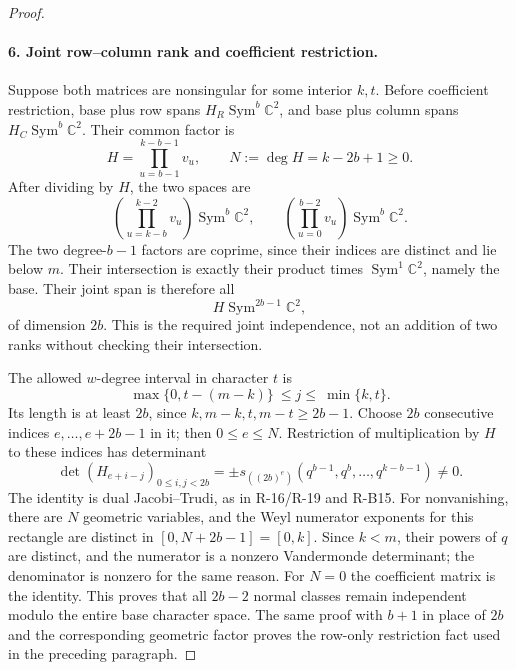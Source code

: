 \begin{proof}
\paragraph{6. Joint row--column rank and coefficient restriction.}
Suppose both matrices are nonsingular for some interior $k,t$.
Before coefficient restriction, base plus row spans
$H_R\operatorname{Sym}^b\mathbb C^2$, and base plus column spans
$H_C\operatorname{Sym}^b\mathbb C^2$. Their common factor is
\[
 H=\prod_{u=b-1}^{k-b-1}v_u,
 \qquad N:=\deg H=k-2b+1\geq0.
\]
After dividing by $H$, the two spaces are
\[
 \left(\prod_{u=k-b}^{k-2}v_u\right)\operatorname{Sym}^b\mathbb C^2,
 \qquad
 \left(\prod_{u=0}^{b-2}v_u\right)\operatorname{Sym}^b\mathbb C^2.
\]
The two degree-$b-1$ factors are coprime, since their indices are
distinct and lie below $m$. Their intersection is exactly their
product times $\operatorname{Sym}^1\mathbb C^2$, namely the base.
Their joint span is therefore all
\begin{equation}\label{R22:joint_space}
 H\operatorname{Sym}^{2b-1}\mathbb C^2,
\end{equation}
of dimension $2b$. This is the required joint independence, not an
addition of two ranks without checking their intersection.

The allowed $w$-degree interval in character $t$ is
\[
 \max\{0,t-(m-k)\}\ \leq j\leq\ \min\{k,t\}.
\]
Its length is at least $2b$, since $k,m-k,t,m-t\geq2b-1$.
Choose $2b$ consecutive indices $e,\ldots,e+2b-1$ in it;
then $0\leq e\leq N$. Restriction of multiplication by $H$ to
these indices has determinant
\begin{equation}\label{R22:schur}
 \det(H_{e+i-j})_{0\leq i,j<2b}
 =\pm s_{((2b)^e)}(q^{b-1},q^b,\ldots,q^{k-b-1})\ne0.
\end{equation}
The identity is dual Jacobi--Trudi, as in R-16/R-19 and R-B15.
For nonvanishing, there are $N$ geometric variables, and the Weyl
numerator exponents for this rectangle are distinct in
$[0,N+2b-1]=[0,k]$. Since $k<m$, their powers of $q$ are distinct,
and the numerator is a nonzero Vandermonde determinant; the
denominator is nonzero for the same reason. For $N=0$ the coefficient
matrix is the identity. This proves that all $2b-2$ normal classes
remain independent modulo the entire base character space.
The same proof with $b+1$ in place of $2b$ and the corresponding
geometric factor proves the row-only restriction fact used in the
preceding paragraph.


\end{proof}
